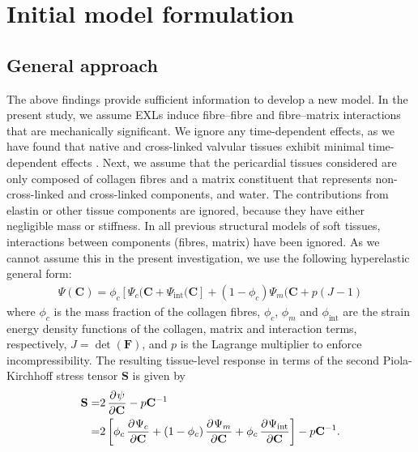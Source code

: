 \section{Initial model formulation}

\subsection{General approach}

    The above findings provide sufficient information to develop a new model. In the present study, we assume EXLs induce fibre–fibre and fibre–matrix interactions that are mechanically significant. We ignore any time-dependent effects, as we have found that native and cross-linked valvular tissues exhibit minimal time-dependent effects \cite{grashow_planar_2006}\cite{grashow_biaxial_2006}\cite{stella_time_2007}\cite{eckert_biomechanical_2013}. Next, we assume that the pericardial tissues considered are only composed of collagen fibres and a matrix constituent that represents non-cross-linked and cross-linked components, and water. The contributions from elastin or other tissue components are ignored, because they have either negligible mass or stiffness. In all previous structural models of soft tissues, interactions between components (fibres, matrix) have been ignored. As we cannot assume this in the present investigation, we use the following hyperelastic general form:
        \begin{equation}\label{c3:eqn:41}
        \begin{aligned}
        \Psi(\mathbf{C}) = \phi_c[\Psi_c(\mathbf{C} +\Psi_\mathrm{int}(\mathbf{C}] + (1-\phi_c)\Psi_m(\mathbf{C} + p(J-1)
        \end{aligned}
        \end{equation}
    where $\phi_c$ is the mass fraction of the collagen fibres, $\phi_c$, $\phi_m$ and $\phi_\mathrm{int}$ are the strain energy density functions of the collagen, matrix and interaction terms, respectively, $J=\operatorname{det}(\mathbf{F})$, and $p$ is the Lagrange multiplier to enforce incompressibility. The resulting tissue-level response in terms of the second Piola-Kirchhoff stress tensor $\mathbf{S}$ is given by
        \begin{equation}\label{c3:eqn:42}
        \begin{aligned}
        \mathbf{S} =& 2\dpd{\psi}{\mathbf{C}} - p\mathbf{C}^{-1} \\
            =& 2\left[\phi_c\dpd{\Psi_c}{\mathbf{C}} + (1-\phi_c) \dpd{\Psi_m}{\mathbf{C}} + \phi_c \dpd{\Psi_\mathrm{int}}{\mathbf{C}}\right] - p\mathbf{C}^{-1}.
        \end{aligned}
        \end{equation}
        



